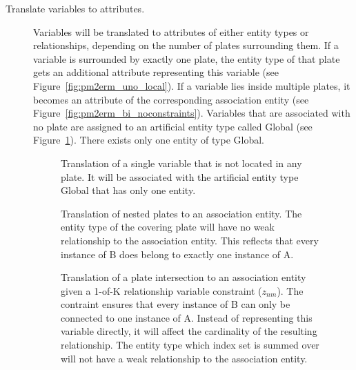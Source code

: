 \begin{description}
\item[Translate variables to attributes.] Variables will be translated to attributes of either entity types or relationships, depending on the number of plates surrounding them. If a variable is surrounded by exactly one plate, the entity type of that plate gets an additional attribute representing this variable (see Figure~\ref{fig:pm2erm_uno_local}). If a variable lies inside multiple plates, it becomes an attribute of the corresponding association entity (see Figure~\ref{fig:pm2erm_bi_noconstraints}). Variables that are associated with no plate are assigned to an artificial entity type called Global (see Figure~\ref{fig:pm2erm_uno_global}). There exists only one entity of type Global.

\begin{figure}[p]
\centering
\scalebox{\tikzScale}{\adjustTikzSize }
\caption[Translation of a variable associated with no plate to an ERM]{Translation of a single variable that is not located in any plate. It will be associated with the artificial entity type Global that has only one entity.}\label{fig:pm2erm_uno_global}
\end{figure}

\begin{figure}[p]
\centering
\scalebox{\tikzScale}{\adjustTikzSize }
\caption[Translation of nested plates to an ERM]{Translation of nested plates to an association entity. The entity type of the covering plate will have no weak relationship to the association entity. This reflects that every instance of B does belong to exactly one instance of A.}\label{fig:pm2erm_covered_1}
\end{figure}

\begin{figure}[p]
\centering
\scalebox{\tikzScale}{\adjustTikzSize }
\caption[Translation of plate intersections with 1-of-K variables to an ERM]{Translation of a plate intersection to an association entity given a 1-of-K relationship variable constraint ($z_{nm}$). The contraint ensures that every instance of B can only be connected to one instance of A. Instead of representing this variable directly, it will affect the cardinality of the resulting relationship. The entity type which index set is summed over will not have a weak relationship to the association entity.}\label{fig:pm2erm_bi_constraints}
\end{figure}


\end{description}
